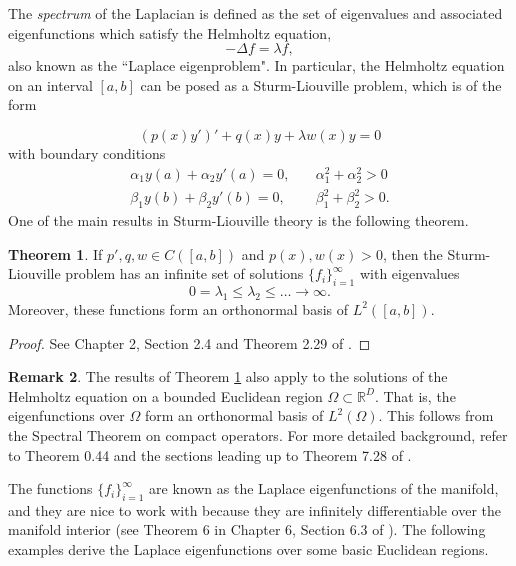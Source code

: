 \documentclass{article}
\numberwithin{equation}{section}
\theoremstyle{definition}
\newtheorem{thm}{Theorem}[section]
\newtheorem{rem}[thm]{Remark}
\begin{document}
The \textit{spectrum} of the Laplacian is defined as the set of eigenvalues and associated eigenfunctions which satisfy the Helmholtz equation,
\begin{equation}\label{helmholtz}
    -\Delta f = \lambda f,
\end{equation}
also known as the ``Laplace eigenproblem". In particular, the Helmholtz equation on an interval $[a,b]$ can be posed as a Sturm-Liouville problem, which is of the form

\begin{equation}\label{S-L}
(p(x)y')' + q(x)y + \lambda w(x)y = 0
\end{equation}
with boundary conditions
\begin{align}\label{S-L-boundary}
    \alpha_1 y(a) + \alpha_2 y'(a) = 0, &\quad \alpha^2_1 + \alpha^2_2 > 0 \\
    \beta_1 y(b) + \beta_2 y'(b) = 0, &\quad \beta^2_1 + \beta^2_2 > 0.
\end{align}
One of the main results in Sturm-Liouville theory is the following theorem.

\begin{thm}\label{SL-theory}
If $p', q, w \in C([a,b])$ and $p(x), w(x) > 0$, then the Sturm-Liouville problem has an infinite set of solutions $\{f_i\}_{i=1}^\infty$ with eigenvalues
\begin{equation}\label{laplace-eigenvalues}
    0 = \lambda_1 \le \lambda_2 \le \ldots \rightarrow \infty.
\end{equation}
Moreover, these functions form an orthonormal basis of $L^2([a,b])$.
\end{thm}

\begin{proof}
See Chapter 2, Section 2.4 and Theorem 2.29 of \cite{sl-textbook}.
\end{proof}

\begin{rem}\label{spectral-thm}
The results of Theorem \ref{SL-theory} also apply to the solutions of the Helmholtz equation on a bounded Euclidean region $\Omega \subset \mathbb{R}^D$. That is, the eigenfunctions over $\Omega$ form an orthonormal basis of $L^2(\Omega)$. This follows from the Spectral Theorem on compact operators. For more detailed background, refer to Theorem 0.44 and the sections leading up to Theorem 7.28 of \cite{FOLLAND_2020}.
\end{rem}

The functions $\{f_i\}_{i=1}^\infty$ are known as the Laplace eigenfunctions of the manifold, and they are nice to work with because they are infinitely differentiable over the manifold interior (see Theorem 6 in Chapter 6, Section 6.3 of \cite{Evans_2010}). The following examples derive the Laplace eigenfunctions over some basic Euclidean regions.
\end{document}
